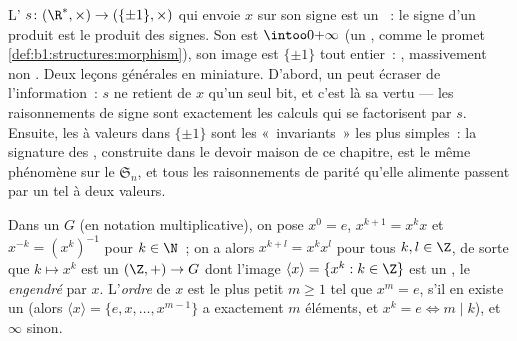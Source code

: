 \begin{example}\label{ex:b1:structures:signmorphism}
L' $s \colon (\R^*, \times) \to (\{\pm1\}, \times)$ qui
envoie $x$ sur son signe est un ~: le signe d'un produit
est le produit des signes. Son  est $\intoo0{+\infty}$ (un
, comme le promet \cref{def:b1:structures:morphism}), son
image est $\{\pm1\}$ tout entier~: , massivement non
. Deux leçons générales en miniature. D'abord, un 
peut écraser de l'information~: $s$ ne retient de $x$ qu'un seul
bit, et c'est là sa vertu --- les raisonnements de signe sont
exactement les calculs qui se factorisent par $s$. Ensuite, les
 à valeurs dans $\{\pm1\}$ sont les «~invariants~» les
plus simples~: la signature des , construite dans le
devoir maison de ce chapitre, est le même phénomène sur le 
$\mathfrak S_n$, et tous les raisonnements de parité qu'elle
alimente passent par un tel  à deux valeurs.
\end{example}

\begin{definition}\label{def:b1:structures:order}
Dans un  $G$ (en notation multiplicative), on pose $x^0 = e$,
$x^{k+1} = x^k x$ et $x^{-k} = (x^k)^{-1}$ pour $k \in \N$~; on a alors
$x^{k+l} = x^k x^l$ pour tous $k, l \in \Z$, de sorte que $k \mapsto
x^k$ est un  $(\Z, +) \to G$ dont l'image $\langle x \rangle =
\{x^k : k \in \Z\}$ est un , le 
\emph{engendré} par $x$. L'\emph{ordre} de
$x$ est le plus petit $m \geq 1$ tel que $x^m = e$, s'il en existe un
(alors $\langle x\rangle = \{e, x, \dots, x^{m-1}\}$ a exactement $m$
éléments, et $x^k = e \iff m \mid k$), et $\infty$ sinon.
\end{definition}

